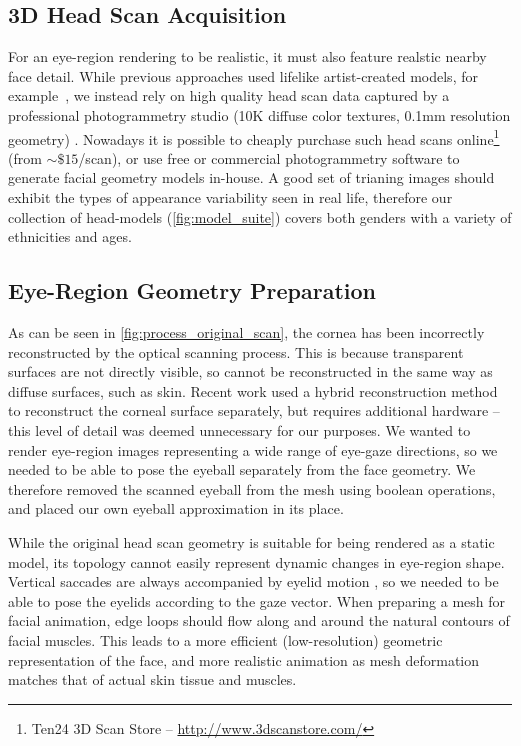 \subsection{3D Head Scan Acquisition}
\label{sec:eye_region_geom_prep}



For an eye-region rendering to be realistic, it must also feature realstic nearby face detail. While previous approaches used lifelike artist-created models, for example~\cite{swirski2014rendering}, we instead rely on high quality head scan data captured by a professional photogrammetry studio (10K diffuse color textures, 0.1mm resolution geometry) \cite{Ten24}.
Nowadays it is possible to cheaply purchase such head scans online\footnote{Ten24 3D Scan Store -- \url{http://www.3dscanstore.com/}} (from $\sim\!\$15$/scan), or use free or commercial photogrammetry software to generate facial geometry models in-house.
A good set of trianing images should exhibit the types of appearance variability seen in real life, therefore our collection of head-models (\autoref{fig:model_suite}) covers both genders with a variety of ethnicities and ages.

\subsection{Eye-Region Geometry Preparation}

As can be seen in \autoref{fig:process_original_scan}, the cornea has been incorrectly reconstructed by the optical scanning process.
This is because transparent surfaces are not directly visible, so cannot be reconstructed in the same way as diffuse surfaces, such as skin.
Recent work used a hybrid reconstruction method to reconstruct the corneal surface separately, but requires additional hardware \cite{berard2014highquality} -- this level of detail was deemed unnecessary for our purposes.
We wanted to render eye-region images representing a wide range of eye-gaze directions, so we needed to be able to pose the eyeball separately from the face geometry.
We therefore removed the scanned eyeball from the mesh using boolean operations, and placed our own eyeball approximation in its place.

While the original head scan geometry is suitable for being rendered as a static model, its topology cannot easily represent dynamic changes in eye-region shape.
Vertical saccades are always accompanied by eyelid motion \cite{liversedge2011oxford}, so we needed to be able to pose the eyelids according to the gaze vector.
When preparing a mesh for facial animation, edge loops should flow along and around the natural contours of facial muscles.
This leads to a more efficient (low-resolution) geometric representation of the face, and more realistic animation as mesh deformation matches that of actual skin tissue and muscles.

